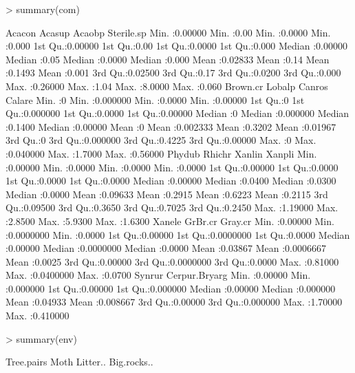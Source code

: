\documentclass[a4paper]{article}
\begin{document}
\begin{Schunk}
\begin{Sinput}
> summary(com)
\end{Sinput}
\begin{Soutput}
     Acacon            Acasup         Acaobp         Sterile.sp   
 Min.   :0.00000   Min.   :0.00   Min.   :0.0000   Min.   :0.000  
 1st Qu.:0.00000   1st Qu.:0.00   1st Qu.:0.0000   1st Qu.:0.000  
 Median :0.00000   Median :0.05   Median :0.0000   Median :0.000  
 Mean   :0.02833   Mean   :0.14   Mean   :0.1493   Mean   :0.001  
 3rd Qu.:0.02500   3rd Qu.:0.17   3rd Qu.:0.0200   3rd Qu.:0.000  
 Max.   :0.26000   Max.   :1.04   Max.   :8.0000   Max.   :0.060  
    Brown.cr     Lobalp             Canros           Calare       
 Min.   :0   Min.   :0.000000   Min.   :0.0000   Min.   :0.00000  
 1st Qu.:0   1st Qu.:0.000000   1st Qu.:0.0000   1st Qu.:0.00000  
 Median :0   Median :0.000000   Median :0.1400   Median :0.00000  
 Mean   :0   Mean   :0.002333   Mean   :0.3202   Mean   :0.01967  
 3rd Qu.:0   3rd Qu.:0.000000   3rd Qu.:0.4225   3rd Qu.:0.00000  
 Max.   :0   Max.   :0.040000   Max.   :1.7000   Max.   :0.56000  
     Phydub            Rhichr           Xanlin           Xanpli      
 Min.   :0.00000   Min.   :0.0000   Min.   :0.0000   Min.   :0.0000  
 1st Qu.:0.00000   1st Qu.:0.0000   1st Qu.:0.0000   1st Qu.:0.0000  
 Median :0.00000   Median :0.0400   Median :0.0300   Median :0.0000  
 Mean   :0.09633   Mean   :0.2915   Mean   :0.6223   Mean   :0.2115  
 3rd Qu.:0.09500   3rd Qu.:0.3650   3rd Qu.:0.7025   3rd Qu.:0.2450  
 Max.   :1.19000   Max.   :2.8500   Max.   :5.9300   Max.   :1.6300  
     Xanele           GrBr.cr             Gray.cr      
 Min.   :0.00000   Min.   :0.0000000   Min.   :0.0000  
 1st Qu.:0.00000   1st Qu.:0.0000000   1st Qu.:0.0000  
 Median :0.00000   Median :0.0000000   Median :0.0000  
 Mean   :0.03867   Mean   :0.0006667   Mean   :0.0025  
 3rd Qu.:0.00000   3rd Qu.:0.0000000   3rd Qu.:0.0000  
 Max.   :0.81000   Max.   :0.0400000   Max.   :0.0700  
     Synrur        Cerpur.Bryarg     
 Min.   :0.00000   Min.   :0.000000  
 1st Qu.:0.00000   1st Qu.:0.000000  
 Median :0.00000   Median :0.000000  
 Mean   :0.04933   Mean   :0.008667  
 3rd Qu.:0.00000   3rd Qu.:0.000000  
 Max.   :1.70000   Max.   :0.410000  
\end{Soutput}
\begin{Sinput}
> summary(env)
\end{Sinput}
\begin{Soutput}
   Tree.pairs        Moth        Litter..       Big.rocks..    

\end{Soutput}
\end{Schunk}
\end{document}
